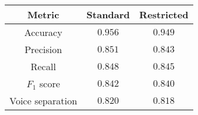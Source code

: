 \begin{tabular}{ccc}
    \textbf{Metric}  & \textbf{Standard} & \textbf{Restricted} \\\hline
    Accuracy         & $\mathbf{0.956}$           & $0.949$                \\
    Precision        & $\mathbf{0.851}$           & $0.843$                \\
    Recall           & $\mathbf{0.848}$           & $0.845$                \\
    $F_1$ score      & $\mathbf{0.842}$           & $0.840$                \\
    Voice separation & $\mathbf{0.820}$           & $0.818$                \\
\end{tabular}
